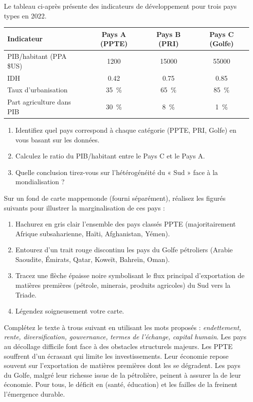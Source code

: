 \documentclass[11pt]{article}
\begin{document}
\begin{exercice}
Le tableau ci-après présente des indicateurs de développement pour trois pays types en \num{2022}.
\begin{tabular}{lccc}
\toprule
Indicateur & Pays A (PPTE) & Pays B (PRI) & Pays C (Golfe) \\
\midrule
PIB/habitant (PPA \$US) & \num{1200} & \num{15000} & \num{55000} \\
IDH & \num{0,42} & \num{0,75} & \num{0,85} \\
Taux d'urbanisation & \SI{35}{\%} & \SI{65}{\%} & \SI{85}{\%} \\
Part agriculture dans PIB & \SI{30}{\%} & \SI{8}{\%} & \SI{1}{\%} \\
\bottomrule
\end{tabular}
\begin{enumerate}
\item Identifiez quel pays correspond à chaque catégorie (PPTE, PRI, Golfe) en vous basant sur les données.
\item Calculez le ratio du PIB/habitant entre le Pays C et le Pays A.
\item Quelle conclusion tirez-vous sur l'hétérogénéité du « Sud » face à la mondialisation ?
\end{enumerate}
\end{exercice}

\begin{exercice}
Sur un fond de carte mappemonde (fourni séparément), réalisez les figurés suivants pour illustrer la marginalisation de ces pays :
\begin{enumerate}
\item Hachurez en gris clair l'ensemble des pays classés PPTE (majoritairement Afrique subsaharienne, Haïti, Afghanistan, Yémen).
\item Entourez d'un trait rouge discontinu les pays du Golfe pétroliers (Arabie Saoudite, Émirats, Qatar, Koweït, Bahreïn, Oman).
\item Tracez une flèche épaisse noire symbolisant le flux principal d'exportation de matières premières (pétrole, minerais, produits agricoles) du Sud vers la Triade.
\item Légendez soigneusement votre carte.
\end{enumerate}
\end{exercice}

\begin{exercice}
Complétez le texte à trous suivant en utilisant les mots proposés : \textit{endettement, rente, diversification, gouvernance, termes de l'échange, capital humain}.
Les pays au décollage difficile font face à des obstacles structurels majeurs. Les PPTE souffrent d'un \dotfill écrasant qui limite les investissements. Leur économie repose souvent sur l'exportation de matières premières dont les \dotfill se dégradent. Les pays du Golfe, malgré leur richesse issue de la \dotfill pétrolière, peinent à assurer la \dotfill de leur économie. Pour tous, le déficit en \dotfill (santé, éducation) et les failles de la \dotfill freinent l'émergence durable.
\end{exercice}
\end{document}
